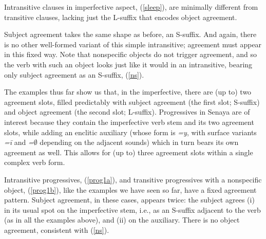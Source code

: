 \documentclass[output=paper
,modfonts
,nonflat]{langsci/langscibook}
\begin{document}
Intransitive clauses in imperfective aspect, (\ref{sleep}), are minimally different from transitive clauses, lacking just the L-suffix that encodes object agreement.

\eal \label{sleep}
\zl

\noindent Subject agreement takes the same shape as before, an S-suffix. And again, there is no other well-formed variant of this simple intransitive; agreement must appear in this fixed way. Note that nonspecific objects do not trigger agreement, and so the verb with such an object looks just like it would in an intransitive, bearing only subject agreement as an S-suffix, (\ref{ns}).

\eal \label{ns}
\zl

The examples thus far show us that, in the imperfective, there are (up to) two agreement slots, filled predictably with subject agreement (the first slot; S-suffix) and object agreement (the second slot; L-suffix). Progressives in Senaya are of interest because they contain the imperfective verb stem and its two agreement slots, while adding an enclitic auxiliary (whose form is \textit{=y}, with surface variants \textit{=\=i} and \textit{=$\emptyset$} depending on the adjacent sounds) which in turn bears its own agreement as well. This allows for (up to) three agreement slots within a single complex verb form.

Intransitive progressives, (\ref{prog1a}), and transitive progressives with a nonspecific object, (\ref{prog1b}), like the examples we have seen so far, have a fixed agreement pattern. Subject agreement, in these cases, appears twice: the subject agrees (i) in its usual spot on the imperfective stem, i.e., as an S-suffix adjacent to the verb (as in all the examples above), and (ii) on the auxiliary. There is no object agreement, consistent with (\ref{ns}).
\end{document}
